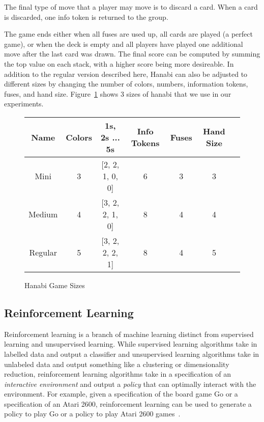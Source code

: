 The final type of move that a player may move is to discard a card. When a card
is discarded, one info token is returned to the group.

The game ends either when all fuses are used up, all cards are played (a perfect
game), or when the deck is empty and all players have played one additional
move after the last card was drawn. The final score can be computed by summing
the top value on each stack, with a higher score being more desireable. In addition
to the regular version described here, Hanabi can also be adjusted to different
sizes by changing the number of colors, numbers, information tokens, fuses, and
hand size. Figure~\ref{fig:hanabisizes} shows 3 sizes of hanabi that we use in
our experiments.

\begin{figure}[ht]
    \centering
    \begin{tabular}{|c | c | c | c | c | c | c |} \hline
        Name        & Colors & 1s, 2s ... 5s  & Info Tokens & Fuses & Hand Size \\ \hline
        Mini        & 3      & [2, 2, 1, 0, 0]    & 6           & 3     & 3 \\ \hline
        Medium      & 4      & [3, 2, 2, 1, 0] & 8           & 4     & 4 \\ \hline
        Regular     & 5      & [3, 2, 2, 2, 1] & 8 & 4 & 5 \\ \hline
    \end{tabular}
    \caption{Hanabi Game Sizes}
    \label{fig:hanabisizes}
\end{figure}





\subsection{Reinforcement Learning}
\label{sec:background:mdp}
Reinforcement learning is a branch of machine learning distinct from supervised
learning and unsupervised learning. While supervised learning algorithms take
in labelled data and output a classifier and unsupervised learning algorithms
take in unlabeled data and output something like a clustering or
dimensionality reduction, reinforcement learning algorithms take in a
specification of an \emph{interactive environment} and output a \emph{policy}
that can optimally interact with the environment. For example, given a
specification of the board game Go or a specification of an Atari 2600,
reinforcement learning can be used to generate a policy to play Go or a policy
to play Atari 2600 games~\cite{silver2016mastering,mnih2015human}.

